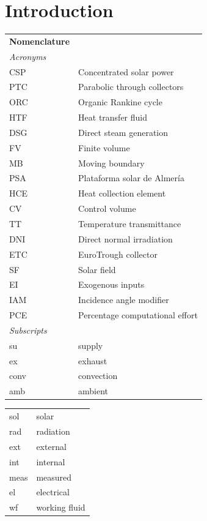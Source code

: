 \documentclass[final,3p,times,review]{elsarticle}
\begin{document}
\section{Introduction}
\label{Intro}


\begin{table}[h!]
\begin{tabular}{lp{7.5cm}}
\textbf{Nomenclature}\\
\textit{Acronyms} \\
CSP & Concentrated solar power\\
PTC & Parabolic through collectors\\
ORC & Organic Rankine cycle\\
HTF & Heat transfer fluid\\
DSG & Direct steam generation\\
FV  & Finite volume \\
MB & Moving boundary \\
PSA & Plataforma solar de Almer\' ia \\
HCE & Heat collection element \\
CV & Control volume \\
TT & Temperature transmittance \\
DNI & Direct normal irradiation \\
ETC & EuroTrough collector \\
SF & Solar field \\
EI & Exogenous inputs \\
IAM & Incidence angle modifier \\
PCE & Percentage computational effort \\
\textit{Subscripts} \\
su  & supply \\
ex & exhaust \\
conv & convection \\
amb & ambient \\
\end{tabular}
\begin{tabular}{lp{7.5cm}}
sol  & solar\\
rad & radiation\\
ext & external\\
int & internal \\
meas & measured \\
el & electrical \\
wf & working fluid \\

\end{tabular}
\end{table}
\end{document}
